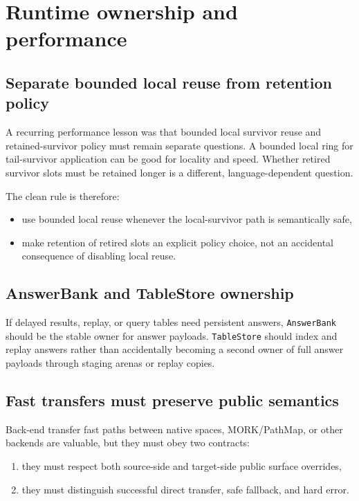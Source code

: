 \documentclass[11pt]{article}
\begin{document}
\section{Runtime ownership and performance}

\subsection{Separate bounded local reuse from retention policy}

A recurring performance lesson was that bounded local survivor reuse and retained-survivor policy must remain separate questions. A bounded local ring for tail-survivor application can be good for locality and speed. Whether retired survivor slots must be retained longer is a different, language-dependent question.

The clean rule is therefore:
\begin{itemize}
    \item use bounded local reuse whenever the local-survivor path is semantically safe,
    \item make retention of retired slots an explicit policy choice, not an accidental consequence of disabling local reuse.
\end{itemize}

\subsection{AnswerBank and TableStore ownership}

If delayed results, replay, or query tables need persistent answers, \texttt{AnswerBank} should be the stable owner for answer payloads. \texttt{TableStore} should index and replay answers rather than accidentally becoming a second owner of full answer payloads through staging arenas or replay copies.

\subsection{Fast transfers must preserve public semantics}

Back-end transfer fast paths between native spaces, MORK/PathMap, or other backends are valuable, but they must obey two contracts:
\begin{enumerate}
    \item they must respect both source-side and target-side public surface overrides,
    \item they must distinguish successful direct transfer, safe fallback, and hard error.
\end{enumerate}
\end{document}
